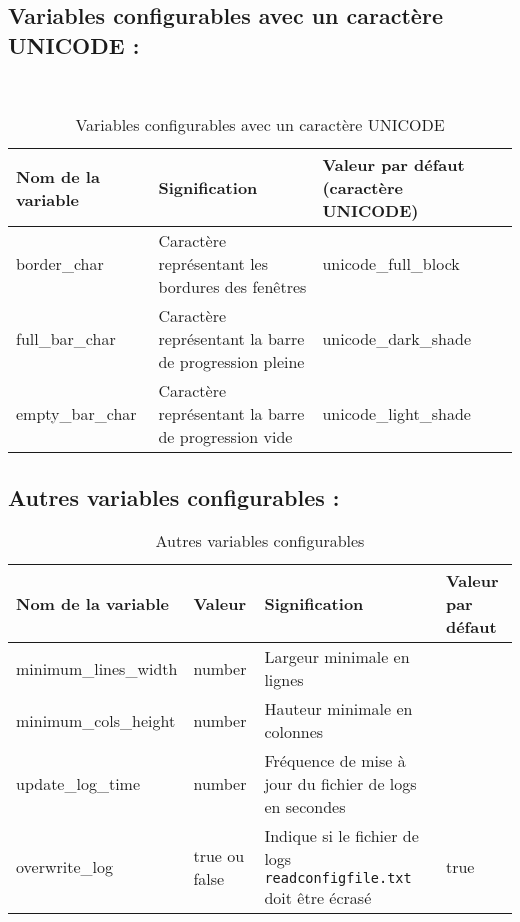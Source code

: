 \documentclass{article}
\begin{document}
\newpage
\subsection{Variables configurables avec un caractère UNICODE :}
\
\begin{table}[h!]
    \centering
    \renewcommand{\arraystretch}{1.5}
    \footnotesize
    \begin{tabular}{|>{\centering\arraybackslash}m{3cm}|>{\centering\arraybackslash}m{3cm}|>{\centering\arraybackslash}m{3cm}|}
        \hline
        \textbf{Nom de la variable} & \textbf{Signification} & \textbf{Valeur par défaut (caractère UNICODE)} \\
        \hline
        border\_char & Caractère représentant les bordures des fenêtres & unicode\_full\_block \\
        \hline
        full\_bar\_char & Caractère représentant la barre de progression pleine & unicode\_dark\_shade \\
        \hline
        empty\_bar\_char & Caractère représentant la barre de progression vide & unicode\_light\_shade \\
        \hline
    \end{tabular}
    \label{tab:configable_unicode_var}
    \caption{Variables configurables avec un caractère UNICODE}
\end{table}

\subsection{Autres variables configurables :}
\begin{table}[h!]
    \centering
    \renewcommand{\arraystretch}{1.5}
    \footnotesize
    \begin{tabular}{|>{\centering\arraybackslash}m{3cm}|>{\centering\arraybackslash}m{1.6cm}|>{\centering\arraybackslash}m{3cm}|>{\centering\arraybackslash}m{1.6cm}|}
        \hline
        \textbf{Nom de la variable} & \textbf{Valeur} & \textbf{Signification} & \textbf{Valeur par défaut} \\
        \hline
        minimum\_lines\_width & number & Largeur minimale en lignes & 30 \\
        \hline
        minimum\_cols\_height & number & Hauteur minimale en colonnes & 70 \\
        \hline
        update\_log\_time & number & Fréquence de mise à jour du fichier de logs en secondes & 60 \\
        \hline
        overwrite\_log & true ou false & Indique si le fichier de logs \texttt{readconfigfile.txt} doit être écrasé & true \\
        \hline
    \end{tabular}
    \label{tab:configable_other_var}
    \caption{Autres variables configurables}
\end{table}
\end{document}
